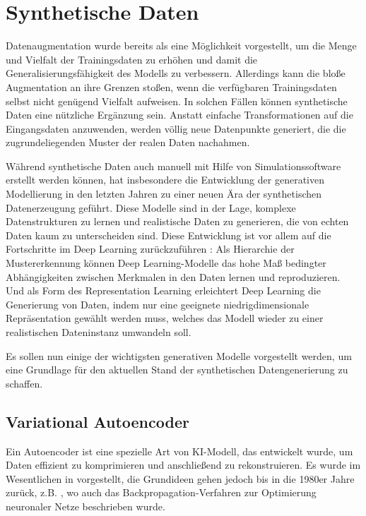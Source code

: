 \section{Synthetische Daten} \label{sec:synt-data}

Datenaugmentation wurde bereits als eine Möglichkeit vorgestellt, um die Menge und Vielfalt der Trainingsdaten zu erhöhen und damit die Generalisierungsfähigkeit des Modells zu verbessern. Allerdings kann die bloße Augmentation an ihre Grenzen stoßen, wenn die verfügbaren Trainingsdaten selbst nicht genügend Vielfalt aufweisen. In solchen Fällen können synthetische Daten eine nützliche Ergänzung sein. Anstatt einfache Transformationen auf die Eingangsdaten anzuwenden, werden völlig neue Datenpunkte generiert, die die zugrundeliegenden Muster der realen Daten nachahmen.

Während synthetische Daten auch manuell mit Hilfe von Simulationssoftware erstellt werden können, hat insbesondere die Entwicklung der generativen Modellierung in den letzten Jahren zu einer neuen Ära der synthetischen Datenerzeugung geführt. Diese Modelle sind in der Lage, komplexe Datenstrukturen zu lernen und realistische Daten zu generieren, die von echten Daten kaum zu unterscheiden sind. Diese Entwicklung ist vor allem auf die Fortschritte im Deep Learning zurückzuführen \parencite{Foster2020gendeeplearning}: Als Hierarchie der Mustererkennung können Deep Learning-Modelle das hohe Maß bedingter Abhängigkeiten zwischen Merkmalen in den Daten lernen und reproduzieren. Und als Form des Representation Learning erleichtert Deep Learning die Generierung von Daten, indem nur eine geeignete niedrigdimensionale Repräsentation gewählt werden muss, welches das Modell wieder zu einer realistischen Dateninstanz umwandeln soll.

Es sollen nun einige der wichtigsten generativen Modelle vorgestellt werden, um eine Grundlage für den aktuellen Stand der synthetischen Datengenerierung zu schaffen.


\subsection{Variational Autoencoder} \label{sec:vae}

Ein Autoencoder ist eine spezielle Art von KI-Modell, das entwickelt wurde, um Daten effizient zu komprimieren und anschließend zu rekonstruieren. Es wurde im Wesentlichen in \parencite{Hinton2006autoencoder} vorgestellt, die Grundideen gehen jedoch bis in die 1980er Jahre zurück, z.B. \parencite{Rumelhart1986backpropagation}, wo auch das Backpropagation-Verfahren zur Optimierung neuronaler Netze beschrieben wurde.

